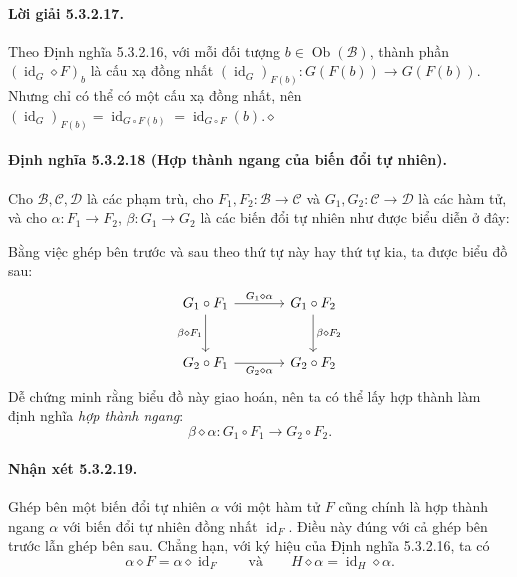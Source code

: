\paragraph{Lời giải 5.3.2.17.} Theo Định nghĩa 5.3.2.16, với mỗi đối tượng $b\in\operatorname{Ob}(\mathcal B)$, thành phần $(\operatorname{id}_G\diamond F)_b$ là cấu xạ đồng nhất $(\operatorname{id}_G)_{F(b)}:G(F(b))\to G(F(b))$. Nhưng chỉ có thể có một cấu xạ đồng nhất, nên $(\operatorname{id}_G)_{F(b)}=\operatorname{id}_{G\circ F(b)}=\operatorname{id}_{G\circ F}(b)$.\hfill$\diamond$
\paragraph{Định nghĩa 5.3.2.18 (Hợp thành ngang của biến đổi tự nhiên).} Cho $\mathcal B,\mathcal C,\mathcal D$ là các phạm trù, cho $F_1,F_2:\mathcal B\to\mathcal C$ và $G_1,G_2:\mathcal C\to\mathcal D$ là các hàm tử, và cho $\alpha:F_1\to F_2$, $\beta:G_1\to G_2$ là các biến đổi tự nhiên như được biểu diễn ở đây:
\begin{center}\end{center}
Bằng việc ghép bên trước và sau theo thứ tự này hay thứ tự kia, ta được biểu đồ sau:
\[\begin{tikzcd}[column sep=large,row sep=large]
G_1\circ F_1\arrow[r,"G_1\diamond\alpha"]\arrow[d,"\beta\diamond F_1"']&G_1\circ F_2\arrow[d,"\beta\diamond F_2"]\\G_2\circ F_1\arrow[r,"G_2\diamond\alpha"']&G_2\circ F_2
\end{tikzcd}\]
Dễ chứng minh rằng biểu đồ này giao hoán, nên ta có thể lấy hợp thành làm định nghĩa \emph{hợp thành ngang}:
\[\beta\diamond\alpha:G_1\circ F_1\longrightarrow G_2\circ F_2.\]
\paragraph{Nhận xét 5.3.2.19.} Ghép bên một biến đổi tự nhiên $\alpha$ với một hàm tử $F$ cũng chính là hợp thành ngang $\alpha$ với biến đổi tự nhiên đồng nhất $\operatorname{id}_F$. Điều này đúng với cả ghép bên trước lẫn ghép bên sau. Chẳng hạn, với ký hiệu của Định nghĩa 5.3.2.16, ta có
\[\alpha\diamond F=\alpha\diamond\operatorname{id}_F\qquad\text{và}\qquad H\diamond\alpha=\operatorname{id}_H\diamond\alpha.\]
